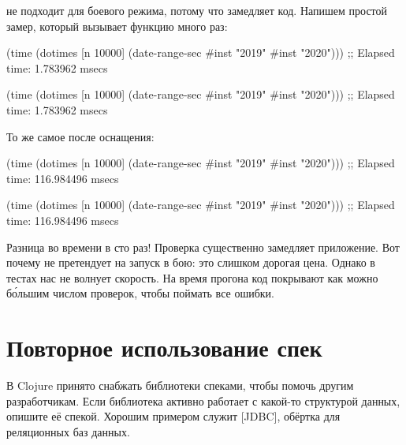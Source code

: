 
 не подходит для боевого режима, потому что замедляет
код. Напишем простой замер, который вызывает функцию много раз:


\ifnarrow


\begin{clojure}
(time
 (dotimes [n 10000]
   (date-range-sec #inst "2019"
                   #inst "2020")))
;; Elapsed time: 1.783962 msecs
\end{clojure}


\else


\begin{clojure}
(time
 (dotimes [n 10000]
   (date-range-sec #inst "2019" #inst "2020")))
;; Elapsed time: 1.783962 msecs
\end{clojure}


\fi

\noindent
То же самое после оснащения:

\pagebreaklarge

\ifnarrow


\begin{clojure}
(time
 (dotimes [n 10000]
   (date-range-sec #inst "2019"
                   #inst "2020")))
;; Elapsed time: 116.984496 msecs
\end{clojure}


\else


\begin{clojure}
(time
 (dotimes [n 10000]
   (date-range-sec #inst "2019" #inst "2020")))
;; Elapsed time: 116.984496 msecs
\end{clojure}


\fi


Разница во времени в сто раз! Проверка существенно замедляет приложение. Вот почему
 не претендует на запуск в бою: это слишком дорогая
цена. Однако в тестах нас не волнует скорость. На время прогона код покрывают
как можно б\'{о}льшим числом проверок, чтобы поймать все ошибки.

\section{Повторное использование спек}


В Clojure принято снабжать библиотеки спеками, чтобы помочь другим
разработчикам. Если библиотека активно работает с какой-то структурой данных,
опишите её спекой. Хорошим примером служит
[JDBC],
обёртка для реляционных баз данных.

